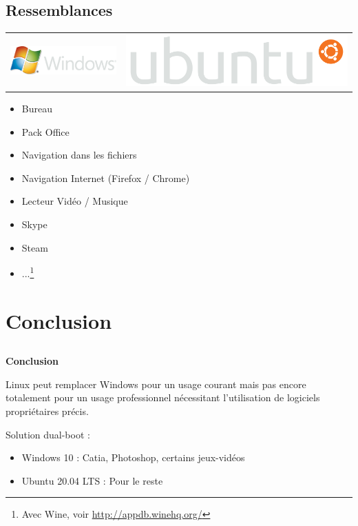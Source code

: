 \documentclass{beamer}
\begin{document}
\subsection{Ressemblances}
\begin{frame}
  
  \begin{center}
\begin{tabular}{c | c}
    \includegraphics[width=0.3\linewidth]{images/Windows_logo}&\includegraphics[width=0.25\linewidth]{images/Ubuntu_logo}
\end{tabular}
  \end{center}

  \begin{itemize}
  \item Bureau
  \item Pack Office
  \item Navigation dans les fichiers
  \item Navigation Internet (Firefox / Chrome)
  \item Lecteur Vid\'eo / Musique
  \item Skype
  \item Steam
  \item ...\footnote{Avec Wine, voir \url{http://appdb.winehq.org/}}
  \end{itemize}
\end{frame}


\section{Conclusion}
\subsection{}
\begin{frame}
  \begin{center}
    {\bf \huge Conclusion}
  \end{center}

  \begin{center}
    Linux peut remplacer Windows pour un usage courant mais pas encore totalement pour un usage professionnel n\'ecessitant l'utilisation de logiciels propri\'etaires précis.
\end{center}

  \begin{block}{ Solution dual-boot :}
    \begin{itemize}
    \item Windows 10 : Catia, Photoshop, certains jeux-vid\'eos
    \item Ubuntu 20.04 LTS : Pour le reste
    \end{itemize}
  \end{block}
\end{frame}
\end{document}
